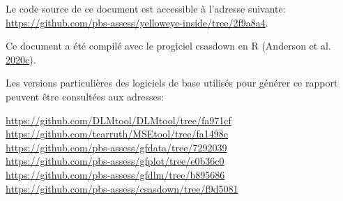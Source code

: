 \documentclass[french,11pt]{book}
\begin{document}
\vspace{4mm}

Le code source de ce document est accessible à l'adresse suivante:\\
\url{https://github.com/pbs-assess/yelloweye-inside/tree/2f9a8a4}.

Ce document a été compilé avec le progiciel csasdown en R (Anderson et al. \protect\hyperlink{ref-csasdown}{2020}\protect\hyperlink{ref-csasdown}{c}).

Les versions particulières des logiciels de base utilisés pour générer ce rapport peuvent être consultées aux adresses:

\url{https://github.com/DLMtool/DLMtool/tree/fa971cf}\\
\url{https://github.com/tcarruth/MSEtool/tree/fa1498c}~\\
\url{https://github.com/pbs-assess/gfdata/tree/7292039}~\\
\url{https://github.com/pbs-assess/gfplot/tree/e0b36c0}~\\
\url{https://github.com/pbs-assess/gfdlm/tree/b895686}~\\
\url{https://github.com/pbs-assess/csasdown/tree/f9d5081}~\\

\clearpage
\end{document}
